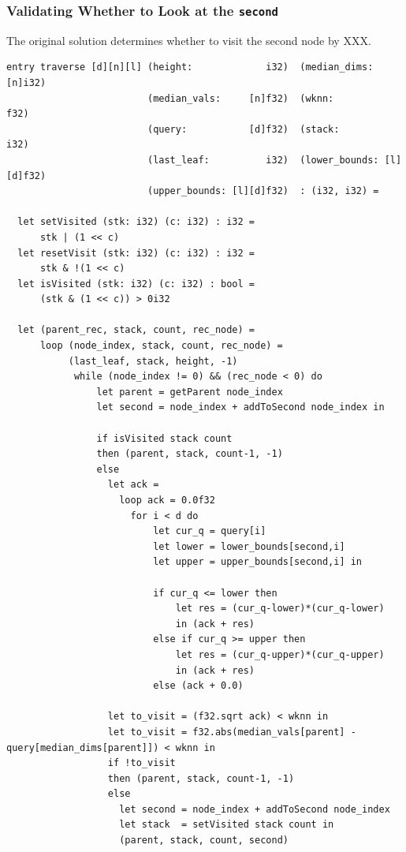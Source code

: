 \subsubsection{Validating Whether to Look at the \texttt{second}}

The original solution determines whether to visit the second node by XXX. 










\begin{listing}[H]
\begin{verbatim}
entry traverse [d][n][l] (height:             i32)  (median_dims:     [n]i32)
                         (median_vals:     [n]f32)  (wknn:               f32)
                         (query:           [d]f32)  (stack:              i32) 
                         (last_leaf:          i32)  (lower_bounds: [l][d]f32)
                         (upper_bounds: [l][d]f32)  : (i32, i32) =

  let setVisited (stk: i32) (c: i32) : i32 =
      stk | (1 << c)
  let resetVisit (stk: i32) (c: i32) : i32 =
      stk & !(1 << c)
  let isVisited (stk: i32) (c: i32) : bool =
      (stk & (1 << c)) > 0i32

  let (parent_rec, stack, count, rec_node) =
      loop (node_index, stack, count, rec_node) =
           (last_leaf, stack, height, -1)
            while (node_index != 0) && (rec_node < 0) do
                let parent = getParent node_index
                let second = node_index + addToSecond node_index in

                if isVisited stack count
                then (parent, stack, count-1, -1)
                else
                  let ack = 
                    loop ack = 0.0f32
                      for i < d do
                          let cur_q = query[i]
                          let lower = lower_bounds[second,i]
                          let upper = upper_bounds[second,i] in

                          if cur_q <= lower then
                              let res = (cur_q-lower)*(cur_q-lower)
                              in (ack + res)
                          else if cur_q >= upper then
                              let res = (cur_q-upper)*(cur_q-upper)
                              in (ack + res)
                          else (ack + 0.0)

                  let to_visit = (f32.sqrt ack) < wknn in
                  let to_visit = f32.abs(median_vals[parent] - query[median_dims[parent]]) < wknn in
                  if !to_visit
                  then (parent, stack, count-1, -1)
                  else
                    let second = node_index + addToSecond node_index
                    let stack  = setVisited stack count in
                    (parent, stack, count, second)



\end{verbatim}
\end{listing}
